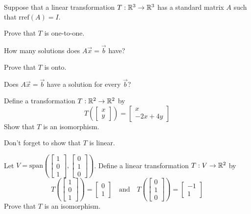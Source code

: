 \documentclass{ximera}
\begin{document}
 \begin{problem}
 Suppose that a linear transformation $T:\mathbb{R}^3\rightarrow \mathbb{R}^3$ has a standard matrix $A$ such that $\text{rref}(A)=I$.
 
 Prove that $T$ is one-to-one.
 \begin{hint}
 How many solutions does $A\vec{x}=\vec{b}$ have?
 \end{hint}
 Prove that $T$ is onto.
 \begin{hint}
 Does $A\vec{x}=\vec{b}$ have a solution for every $\vec{b}$?
 \end{hint}
 \end{problem}
 
 \begin{problem}
 Define a transformation $T:\mathbb{R}^2\rightarrow \mathbb{R}^2$ by 
 $$T\left(\begin{bmatrix}x\\y\end{bmatrix}\right)=\begin{bmatrix}x\\-2x+4y\end{bmatrix}$$
 Show that $T$ is an isomorphism.
 \begin{hint}
 Don't forget to show that $T$ is linear.
 \end{hint}
 \end{problem}
 
 \begin{problem}
 Let $V=\text{span}\left(\begin{bmatrix}1\\0\\1\end{bmatrix}, \begin{bmatrix}0\\1\\0\end{bmatrix}\right)$.  Define a linear transformation $T:V\rightarrow \mathbb{R}^2$ by
 $$T\left(\begin{bmatrix}1\\0\\1\end{bmatrix}\right)=\begin{bmatrix}0\\1\end{bmatrix}\quad \text{and}\quad T\left(\begin{bmatrix}0\\1\\0\end{bmatrix}\right)=\begin{bmatrix}-1\\1\end{bmatrix}$$
 Prove that $T$ is an isomorphism.
 \end{problem}
\end{document}
